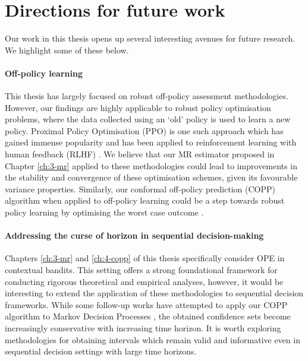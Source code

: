 \section{Directions for future work}
Our work in this thesis opens up several interesting avenues for future research. We highlight some of these below.

\paragraph*{Off-policy learning}
This thesis has largely focused on robust off-policy assessment methodologies. However, our findings are highly applicable to robust policy optimisation problems, where the data collected using an `old’ policy is used to learn a new policy. 
Proximal Policy Optimisation (PPO) \citep{schulman2017proximal} is one such approach which has gained immense popularity and has been applied to reinforcement learning with human feedback (RLHF) \citep{lambert2022illustrating}. 
We believe that our MR estimator proposed in Chapter \ref*{ch:3-mr} applied to these methodologies could lead to improvements in the stability and convergence
of these optimisation schemes, given its favourable variance properties. 
Similarly, our conformal off-policy prediction (COPP) algorithm when applied to off-policy learning could be a
step towards robust policy learning by optimising the worst case outcome \citep{stutz2021learning}.

\paragraph*{Addressing the curse of horizon in sequential decision-making}
Chapters \ref*{ch:3-mr} and \ref*{ch:4-copp} of this thesis specifically consider OPE in contextual bandits. 
This setting offers a strong foundational framework for conducting rigorous theoretical and empirical analyses, 
however, it would be interesting to extend the application of these methodologies to sequential decision frameworks.
While some follow-up works have attempted to apply our COPP algorithm to Markov Decision Processes \citep{foffano2023conformal, zhang2023conformal, kuipers2024conformal}, the obtained confidence sets become increasingly conservative with increasing time horizon. 
It is worth exploring methodologies for obtaining intervals which remain valid and informative even in sequential decision settings with large time horizons.  


